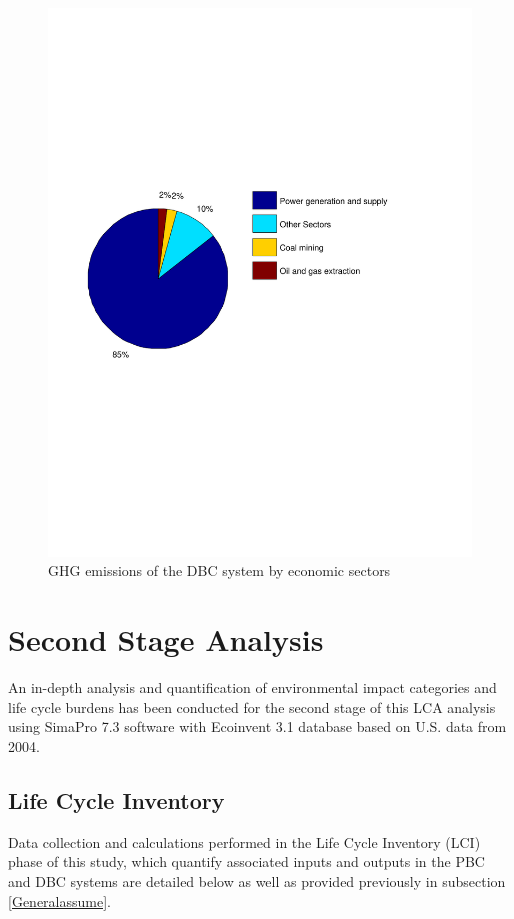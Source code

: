 \documentclass[conference]{IEEEtran}
\begin{document}
\begin{figure}[h]
\centering
\includegraphics[scale=0.45]{g.pdf}
\caption{GHG emissions of the DBC system by economic sectors}
\label{screecn4Sectors}
\end{figure}

\section{Second Stage Analysis}
An in-depth analysis and quantification of environmental impact categories and life cycle burdens has been conducted for the second stage of this LCA analysis using SimaPro 7.3 software with Ecoinvent 3.1 database based on U.S. data from 2004.

\subsection{Life Cycle Inventory}
Data collection and calculations performed in the Life Cycle Inventory (LCI) phase of this study, which quantify associated inputs and outputs in the PBC and DBC systems are detailed below as well as provided previously in subsection \ref{Generalassume}. 
\end{document}
